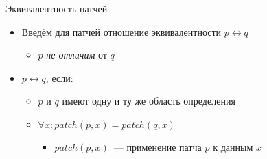 \begin{frame}{Эквивалентность патчей}
  \begin{itemize}
  \item Введём для патчей отношение эквивалентности $p
    \longleftrightarrow q$
    \begin{itemize}
    \item $p$ \emph{не отличим} от $q$
    \end{itemize}
  \item $p \longleftrightarrow q$, если:
    \begin{itemize}
    \item $p$ и $q$ имеют одну и ту же область определения
    \item $\forall x : patch(p, x) = patch(q, x)$
      \begin{itemize}
      \item $patch(p, x)$~--- применение патча $p$ к данным $x$
      \end{itemize}
    \end{itemize}
  \end{itemize}
\end{frame}
